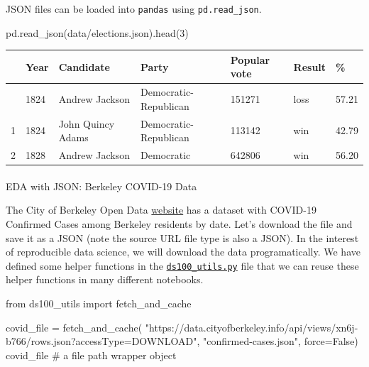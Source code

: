 \documentclass[
  letterpaper,
  DIV=11,
  numbers=noendperiod]{scrreprt}
\makeatletter
\let\oldparagraph\paragraph
\renewcommand{\paragraph}{
    \@ifstar
      \xxxParagraphStar
      \xxxParagraphNoStar
  }
\newcommand{\xxxParagraphStar}[1]{\oldparagraph*{#1}\mbox{}}
\newcommand{\xxxParagraphNoStar}[1]{\oldparagraph{#1}\mbox{}}
\newenvironment{Shaded}{\begin{snugshade}}{\end{snugshade}}
\newcommand{\CommentTok}[1]{\textcolor[rgb]{0.37,0.37,0.37}{#1}}
\newcommand{\DecValTok}[1]{\textcolor[rgb]{0.68,0.00,0.00}{#1}}
\newcommand{\ImportTok}[1]{\textcolor[rgb]{0.00,0.46,0.62}{#1}}
\newcommand{\NormalTok}[1]{\textcolor[rgb]{0.00,0.23,0.31}{#1}}
\newcommand{\OperatorTok}[1]{\textcolor[rgb]{0.37,0.37,0.37}{#1}}
\newcommand{\StringTok}[1]{\textcolor[rgb]{0.13,0.47,0.30}{#1}}
\newcommand{\VariableTok}[1]{\textcolor[rgb]{0.07,0.07,0.07}{#1}}
\makeatother
\begin{document}
JSON files can be loaded into \texttt{pandas} using
\texttt{pd.read\_json}.

\begin{Shaded}
\begin{Highlighting}[]
\NormalTok{pd.read\_json(}\StringTok{\textquotesingle{}data/elections.json\textquotesingle{}}\NormalTok{).head(}\DecValTok{3}\NormalTok{)}
\end{Highlighting}
\end{Shaded}

\begin{longtable}[]{@{}lllllll@{}}
\toprule\noalign{}
& Year & Candidate & Party & Popular vote & Result & \% \\
\midrule\noalign{}
\endhead
\bottomrule\noalign{}
\endlastfoot
0 & 1824 & Andrew Jackson & Democratic-Republican & 151271 & loss &
57.21 \\
1 & 1824 & John Quincy Adams & Democratic-Republican & 113142 & win &
42.79 \\
2 & 1828 & Andrew Jackson & Democratic & 642806 & win & 56.20 \\
\end{longtable}

\paragraph{EDA with JSON: Berkeley COVID-19
Data}\label{eda-with-json-berkeley-covid-19-data}

The City of Berkeley Open Data
\href{https://data.cityofberkeley.info/Health/COVID-19-Confirmed-Cases/xn6j-b766}{website}
has a dataset with COVID-19 Confirmed Cases among Berkeley residents by
date. Let's download the file and save it as a JSON (note the source URL
file type is also a JSON). In the interest of reproducible data science,
we will download the data programatically. We have defined some helper
functions in the
\href{https://ds100.org/fa23/resources/assets/lectures/lec05/lec05-eda.html}{\texttt{ds100\_utils.py}}
file that we can reuse these helper functions in many different
notebooks.

\begin{Shaded}
\begin{Highlighting}[]
\ImportTok{from}\NormalTok{ ds100\_utils }\ImportTok{import}\NormalTok{ fetch\_and\_cache}

\NormalTok{covid\_file }\OperatorTok{=}\NormalTok{ fetch\_and\_cache(}
    \StringTok{"https://data.cityofberkeley.info/api/views/xn6j{-}b766/rows.json?accessType=DOWNLOAD"}\NormalTok{,}
    \StringTok{"confirmed{-}cases.json"}\NormalTok{,}
\NormalTok{    force}\OperatorTok{=}\VariableTok{False}\NormalTok{)}
\NormalTok{covid\_file          }\CommentTok{\# a file path wrapper object}
\end{Highlighting}
\end{Shaded}
\end{document}

